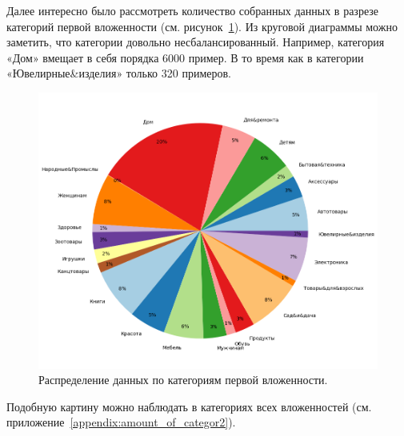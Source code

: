 \documentclass[a4paper,12pt]{extarticle}
\begin{document}
Далее интересно было рассмотреть количество собранных данных в разрезе категорий первой вложенности (см. рисунок~\ref{fig:amount_of_categoty}). Из круговой диаграммы можно заметить, что категории довольно несбалансированный. Например, категория «Дом» вмещает в себя порядка 6000 пример. В то время как в категории «Ювелирные\&изделия» только 320 примеров.

\begin{figure}[ht]
	\centering
	\includegraphics[scale=0.7]{amount_of_categoty.png}
	\caption{Распределение данных по категориям первой вложенности.}
	\label{fig:amount_of_categoty}
\end{figure}

Подобную картину можно наблюдать в категориях всех вложенностей (см. приложение~\ref{appendix:amount_of_categor2}).
\end{document}
